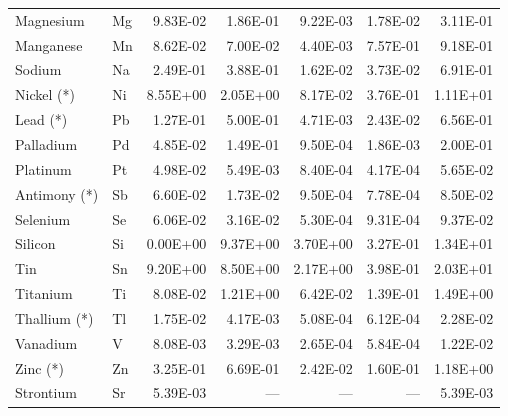 \documentclass[11pt]{article}
\begin{document}
\begin{table}[htbp]
{\begin{tabular}{llrrrrr}
Magnesium & Mg & 9.83E-02 & 1.86E-01 & 9.22E-03 & 1.78E-02 & 3.11E-01 \\
Manganese & Mn & 8.62E-02 & 7.00E-02 & 4.40E-03 & 7.57E-01 & 9.18E-01 \\
Sodium & Na & 2.49E-01 & 3.88E-01 & 1.62E-02 & 3.73E-02 & 6.91E-01 \\
Nickel (*) & Ni & 8.55E+00 & 2.05E+00 & 8.17E-02 & 3.76E-01 & 1.11E+01 \\
Lead (*) & Pb & 1.27E-01 & 5.00E-01 & 4.71E-03 & 2.43E-02 & 6.56E-01 \\
Palladium & Pd & 4.85E-02 & 1.49E-01 & 9.50E-04 & 1.86E-03 & 2.00E-01 \\
Platinum & Pt & 4.98E-02 & 5.49E-03 & 8.40E-04 & 4.17E-04 & 5.65E-02 \\
Antimony (*) & Sb & 6.60E-02 & 1.73E-02 & 9.50E-04 & 7.78E-04 & 8.50E-02 \\
Selenium & Se & 6.06E-02 & 3.16E-02 & 5.30E-04 & 9.31E-04 & 9.37E-02 \\
Silicon & Si & 0.00E+00 & 9.37E+00 & 3.70E+00 & 3.27E-01 & 1.34E+01 \\
Tin & Sn & 9.20E+00 & 8.50E+00 & 2.17E+00 & 3.98E-01 & 2.03E+01 \\
Titanium & Ti & 8.08E-02 & 1.21E+00 & 6.42E-02 & 1.39E-01 & 1.49E+00 \\
Thallium (*) & Tl & 1.75E-02 & 4.17E-03 & 5.08E-04 & 6.12E-04 & 2.28E-02 \\
Vanadium & V & 8.08E-03 & 3.29E-03 & 2.65E-04 & 5.84E-04 & 1.22E-02 \\
Zinc (*) & Zn & 3.25E-01 & 6.69E-01 & 2.42E-02 & 1.60E-01 & 1.18E+00 \\
Strontium & Sr & 5.39E-03& --- & --- & --- & 5.39E-03\\
\hline
\end{tabular}
}
\end{table}
\end{document}
